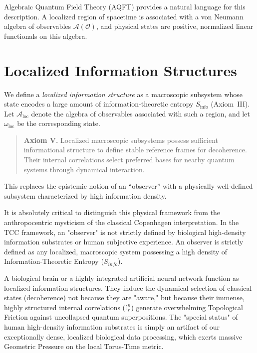 \documentclass[12pt,openany]{book}
\theoremstyle{plain}
\theoremstyle{definition}
\theoremstyle{remark}
\begin{document}
Algebraic Quantum Field Theory (AQFT) provides a natural language for this
description. A localized region of spacetime is associated with a von Neumann
algebra of observables $\mathcal{A}(\mathcal{O})$, and physical states are
positive, normalized linear functionals on this algebra.

\section{Localized Information Structures}

We define a \emph{localized information structure} as a macroscopic subsystem
whose state encodes a large amount of information-theoretic entropy
$S_{\mathrm{info}}$ (Axiom~III). Let $\mathcal{A}_{\mathrm{loc}}$ denote the
algebra of observables associated with such a region, and let $\omega_{\mathrm{loc}}$
be the corresponding state.

\begin{quote}
\textbf{Axiom V.}  
Localized macroscopic subsystems possess sufficient informational structure to
define stable reference frames for decoherence. Their internal correlations
select preferred bases for nearby quantum systems through dynamical
interaction.
\end{quote}

This replaces the epistemic notion of an ``observer'' with a physically
well-defined subsystem characterized by high information density.

It is absolutely critical to distinguish this physical framework from the anthropocentric mysticism of the classical Copenhagen interpretation. In the TCC framework, an "observer" is not strictly defined by biological high-density information substrates or human subjective experience. An observer is strictly defined as any localized, macroscopic system possessing a high density of Information-Theoretic Entropy ($S_{info}$). 

A biological brain or a highly integrated artificial neural network function as localized information structures. They induce the dynamical selection of classical states (decoherence) not because they are "aware," but because their immense, highly structured internal correlations ($\mathbb{I}_r^n$) generate overwhelming Topological Friction against uncollapsed quantum superpositions. The "special status" of human high-density information substrates is simply an artifact of our exceptionally dense, localized biological data processing, which exerts massive Geometric Pressure on the local Torus-Time metric.
\end{document}
